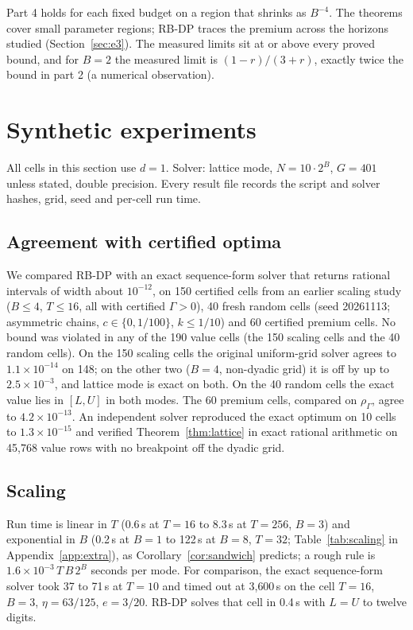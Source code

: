 \documentclass{article}
\theoremstyle{plain}
\theoremstyle{definition}
\theoremstyle{remark}
\newcommand{\rhoG}{\rho_\Gamma}
\begin{document}
Part 4 holds for each fixed budget on a region that shrinks as $B^{-4}$. The theorems cover small parameter regions; RB-DP traces the premium across the horizons studied (Section~\ref{sec:e3}). The measured limits sit at or above every proved bound, and for $B=2$ the measured limit is $(1-r)/(3+r)$, exactly twice the bound in part 2 (a numerical observation).

\section{Synthetic experiments}
\label{sec:synthetic}

All cells in this section use $d=1$. Solver: lattice mode, $N=10\cdot2^B$, $G=401$ unless stated, double precision. Every result file records the script and solver hashes, grid, seed and per-cell run time.

\subsection{Agreement with certified optima}
\label{sec:e1}

We compared RB-DP with an exact sequence-form solver that returns rational intervals of width about $10^{-12}$, on 150 certified cells from an earlier scaling study ($B\le4$, $T\le16$, all with certified $\Gamma>0$), 40 fresh random cells (seed 20261113; asymmetric chains, $c\in\{0,1/100\}$, $k\le1/10$) and 60 certified premium cells. No bound was violated in any of the 190 value cells (the 150 scaling cells and the 40 random cells). On the 150 scaling cells the original uniform-grid solver agrees to $1.1\times10^{-14}$ on 148; on the other two ($B=4$, non-dyadic grid) it is off by up to $2.5\times10^{-3}$, and lattice mode is exact on both. On the 40 random cells the exact value lies in $[L,U]$ in both modes. The 60 premium cells, compared on $\rhoG$, agree to $4.2\times10^{-13}$. An independent solver reproduced the exact optimum on 10 cells to $1.3\times10^{-15}$ and verified Theorem~\ref{thm:lattice} in exact rational arithmetic on 45{,}768 value rows with no breakpoint off the dyadic grid.

\subsection{Scaling}
\label{sec:e2}


Run time is linear in $T$ (0.6\,s at $T=16$ to 8.3\,s at $T=256$, $B=3$) and exponential in $B$ (0.2\,s at $B=1$ to 122\,s at $B=8$, $T=32$; Table~\ref{tab:scaling} in Appendix~\ref{app:extra}), as Corollary~\ref{cor:sandwich} predicts; a rough rule is $1.6\times10^{-3}\,T\,B\,2^B$ seconds per mode. For comparison, the exact sequence-form solver took 37 to 71\,s at $T=10$ and timed out at 3{,}600\,s on the cell $T=16$, $B=3$, $\eta=63/125$, $e=3/20$. RB-DP solves that cell in 0.4\,s with $L=U$ to twelve digits.
\end{document}
